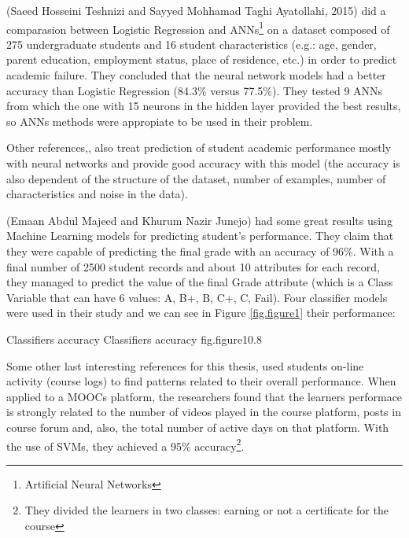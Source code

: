 (Saeed Hosseini Teshnizi and Sayyed Mohhamad Taghi Ayatollahi, 2015)\cite{bibl_3} 
did a comparasion between Logistic Regression and ANNs\footnote{Artificial 
Neural Networks} on a dataset composed of 275 undergraduate students and 16 
student characteristics (e.g.: age, gender, parent education, employment status, 
place of residence, etc.) in order to predict academic failure. They concluded that 
the neural network models had a better accuracy than Logistic Regression (84.3\% 
versus 77.5\%). They tested 9 ANNs from which the one with 15 neurons in the 
hidden layer provided the best results, so ANNs methods were appropiate to be used 
in their problem. 

Other references\cite{bibl_4},\cite{bibl_5},\cite{bibl_6} also treat prediction 
of student academic performance mostly with neural networks and provide good 
accuracy with this model (the accuracy is also dependent of the structure of 
the dataset, number of examples, number of characteristics and noise in the 
data).

(Emaan Abdul Majeed and Khurum Nazir Junejo)\cite{bibl_7} had some great results 
using Machine Learning models for predicting student's performance. They claim 
that they were capable of predicting the final grade with an accuracy of 96\%. 
With a final number of 2500 student records and about 10 attributes for each 
record, they managed to predict the value of the final Grade attribute (which 
is a Class Variable that can have 6 values: A, B+, B, C+, C, Fail). 
Four classifier models were used in their study and we can see in Figure 
\ref{fig.figure1}\cite{bibl_7} their performance: 

%
    {Classifiers accuracy}%
    {Classifiers accuracy}%
    {fig.figure1}{0.8}

Some other last interesting references for this thesis\cite{bibl_8},\cite{bibl_9} 
used students on-line activity (course logs) to find patterns related to their overall 
performance. When applied to a MOOCs platform\cite{bibl_9}, the researchers found 
that the learners performace is strongly related to the number of videos played 
in the course platform, posts in course forum and, also, the total number of active 
days on that platform. With the use of SVMs, they achieved a 95\% accuracy\footnote{They 
divided the learners in two classes: earning or not a certificate for the course}. 
